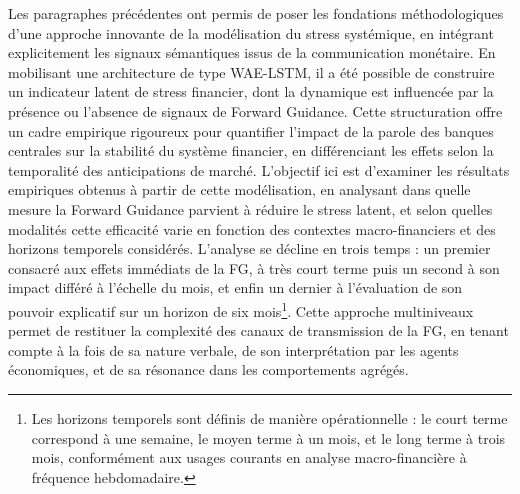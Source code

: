 Les paragraphes précédentes ont permis de poser les fondations méthodologiques d’une approche innovante de la modélisation du stress systémique, en intégrant explicitement les signaux sémantiques issus de la communication monétaire. En mobilisant une architecture de type WAE-LSTM, il a été possible de construire un indicateur latent de stress financier, dont la dynamique est influencée par la présence ou l’absence de signaux de Forward Guidance. Cette structuration offre un cadre empirique rigoureux pour quantifier l’impact de la parole des banques centrales sur la stabilité du système financier, en différenciant les effets selon la temporalité des anticipations de marché. L'objectif  ici est d’examiner les résultats empiriques obtenus à partir de cette modélisation, en analysant dans quelle mesure la Forward Guidance parvient à réduire le stress latent, et selon quelles modalités cette efficacité varie en fonction des contextes macro-financiers et des horizons temporels considérés. L’analyse se décline en trois temps : un premier consacré aux effets immédiats de la FG, à très court terme puis un second à son impact différé à l’échelle du mois, et enfin un dernier à l’évaluation de son pouvoir explicatif sur un horizon de six mois\footnote{Les horizons temporels sont définis de manière opérationnelle : le court terme correspond à une semaine, le moyen terme à un mois, et le long terme à trois mois, conformément aux usages courants en analyse macro-financière à fréquence hebdomadaire.}. Cette approche multiniveaux permet de restituer la complexité des canaux de transmission de la FG, en tenant compte à la fois de sa nature verbale, de son interprétation par les agents économiques, et de sa résonance dans les comportements agrégés.\\

